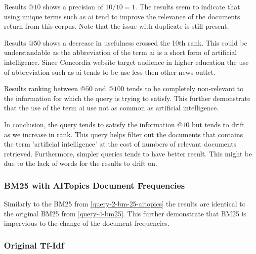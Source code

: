 \par Results $@10$ shows a precision of $10/10=1$. The results seem to indicate that using unique terms such as ai tend to improve the relevance of the documents return from this corpus. Note that the issue with duplicate is still present.
\par Results $@50$ shows a decrease in usefulness crossed the 10th rank. This could be understandable as the abbreviation of the term ai is a short form of artificial intelligence. Since Concordia website target audience in higher education the use of abbreviation such as ai tends to be use less then other news outlet.
\par Results ranking between $@50$ and $@100$ tends to be completely non-relevant to the information for which the query is trying to satisfy. This further demonstrate that the use of the term ai use not as common as artificial intelligence. 
\par In conclusion, the query tends to satisfy the information $@10$ but tends to drift as we increase in rank. This query helps filter out the documents that contains the term 'artificial intelligence' at the cost of numbers of relevant documents retrieved. Furthermore, simpler queries tends to have better result. This might be due to the lack of words for the results to drift on.

\subsubsection{BM25 with AITopics Document Frequencies}\label{query-4-bm25-aitopics}

\par Similarly to the BM25 from \ref{query-2-bm-25-aitopics} the results are identical to the original BM25 from \ref{query-4-bm25}. This further demonstrate that BM25 is impervious to the change of the document frequencies.

\subsubsection{Original Tf-Idf}\label{query-4-tf-idf}

